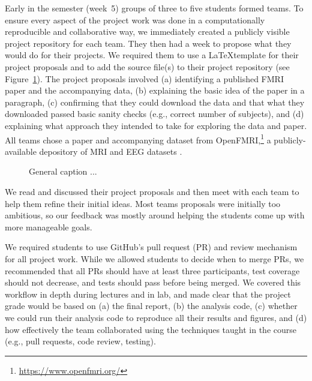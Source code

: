 Early in the semester (week~5) groups of three to five students formed teams.
To ensure every aspect of the project work was done in a computationally
reproducible and collaborative way, we immediately created a publicly visible
project repository for each team.
They then had a week to propose what they would do for their projects.
We required them to use a \LaTeX template for their project proposals
and to add the source file(s) to their project repository (see Figure~\ref{fig:repo}).
The project proposals involved
(a) identifying a published FMRI paper and the accompanying data,
(b) explaining the basic idea of the paper in a paragraph,
(c) confirming that they could download the data and that what they
downloaded passed basic sanity checks (e.g., correct number of subjects), and
(d) explaining what approach they intended to take for exploring
the data and paper.
All teams chose a paper and accompanying dataset from
OpenFMRI,\footnote{\url{https://www.openfmri.org/}} a publicly-available
depository of MRI and EEG datasets
\citep{poldrack2013toward,poldrack2015openfmri}.


\begin{figure}
\centering

\caption{General caption ...}
\label{fig:repo}
\end{figure}

We read and discussed their project proposals and then meet with each
team to help them refine their initial ideas.
Most teams proposals were initially too ambitious, so our feedback
was mostly around helping the students come up with more manageable
goals.

We required students to use GitHub's pull request (PR) and review mechanism
for all project work.
While we allowed students to decide when to merge PRs, we recommended that
all PRs should have at least three participants, test coverage should not decrease,
and tests should pass before being merged.
We covered this workflow in depth during lectures and in lab,
and made clear that the project grade would be based on
(a) the final report,
(b) the analysis code,
(c) whether we could run their analysis code to reproduce all
their results and figures, and
(d) how effectively the team collaborated using the techniques
taught in the course (e.g., pull requests, code review, testing).


